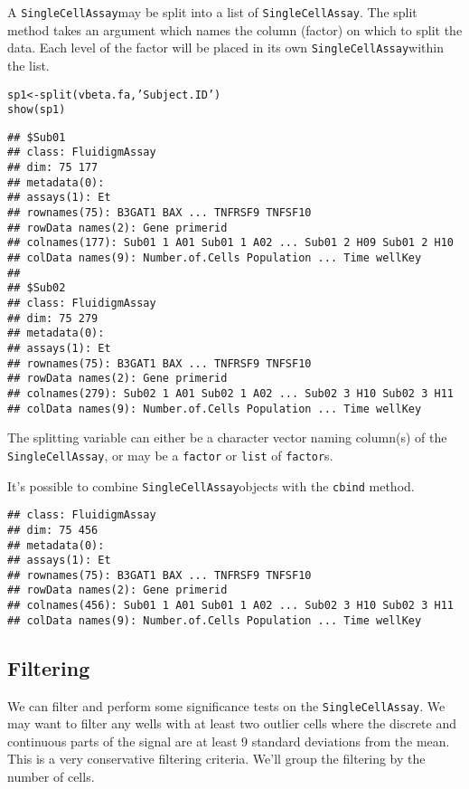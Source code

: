 \documentclass{article}\usepackage[]{graphicx}\usepackage[usenames,dvipsnames]{color}
\newcommand{\hlstr}[1]{\textcolor[rgb]{0.251,0.627,0.251}{#1}}%
\newcommand{\hlstd}[1]{\textcolor[rgb]{0.251,0.251,0.251}{#1}}%
\newcommand{\hlkwb}[1]{\textcolor[rgb]{0,0,0}{#1}}%
\newcommand{\hlkwd}[1]{\textcolor[rgb]{0.878,0.439,0.125}{#1}}%
\newenvironment{knitrout}{}{} %
\newcommand{\sca}{\texttt{SingleCellAssay}}
\begin{document}
A \sca may be split into a list of \sca. 
The split method takes an argument which names the column
(factor) on which to split the data. Each level of the factor will be placed
in its own \sca within the list.
\begin{knitrout}
\color{fgcolor}\begin{kframe}
\begin{alltt}
\hlstd{sp1} \hlkwb{<-} \hlkwd{split}\hlstd{(vbeta.fa,} \hlstr{'Subject.ID'}\hlstd{)}
\hlkwd{show}\hlstd{(sp1)}
\end{alltt}
\begin{verbatim}
## $Sub01
## class: FluidigmAssay 
## dim: 75 177 
## metadata(0):
## assays(1): Et
## rownames(75): B3GAT1 BAX ... TNFRSF9 TNFSF10
## rowData names(2): Gene primerid
## colnames(177): Sub01 1 A01 Sub01 1 A02 ... Sub01 2 H09 Sub01 2 H10
## colData names(9): Number.of.Cells Population ... Time wellKey
## 
## $Sub02
## class: FluidigmAssay 
## dim: 75 279 
## metadata(0):
## assays(1): Et
## rownames(75): B3GAT1 BAX ... TNFRSF9 TNFSF10
## rowData names(2): Gene primerid
## colnames(279): Sub02 1 A01 Sub02 1 A02 ... Sub02 3 H10 Sub02 3 H11
## colData names(9): Number.of.Cells Population ... Time wellKey
\end{verbatim}
\end{kframe}
\end{knitrout}
The splitting variable can either be a character vector naming column(s) of the \sca, or may be a \texttt{factor} or \texttt{list} of \texttt{factor}s.

It's possible to combine \sca objects with the \texttt{cbind} method.
\begin{knitrout}
\color{fgcolor}\begin{kframe}
\begin{verbatim}
## class: FluidigmAssay 
## dim: 75 456 
## metadata(0):
## assays(1): Et
## rownames(75): B3GAT1 BAX ... TNFRSF9 TNFSF10
## rowData names(2): Gene primerid
## colnames(456): Sub01 1 A01 Sub01 1 A02 ... Sub02 3 H10 Sub02 3 H11
## colData names(9): Number.of.Cells Population ... Time wellKey
\end{verbatim}
\end{kframe}
\end{knitrout}

\subsection{Filtering}
We can filter and perform some significance tests on the \sca.
We may want to filter any wells with at least two outlier cells where the discrete and continuous parts of the signal are at least 9 standard deviations from the mean. This is a very conservative filtering criteria. We'll group the filtering by the number of cells.
\end{document}
